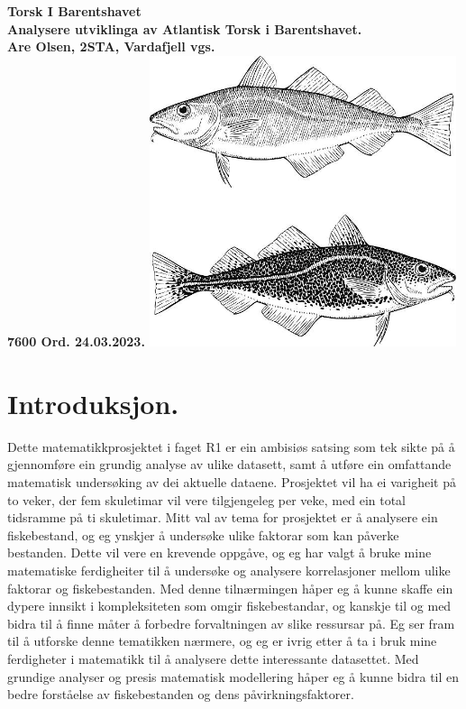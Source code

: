 \documentclass{report}
\begin{document}
\date{\today}
\begin{titlepage}
	\centering
	\vfill
	{\bfseries
		\Huge Torsk I Barentshavet\\ \Large
		Analysere utviklinga av Atlantisk Torsk i Barentshavet.\\
		\vskip2cm
		Are Olsen, 2STA, Vardafjell vgs.\\
		7600 Ord. 24.03.2023.
	}
	\vfill
	\includegraphics[width=9cm]{Bileter/Torsk.jpg} %
	\vfill
	\vfill
\end{titlepage}



\tableofcontents

\chapter{Introduksjon.}
Dette matematikkprosjektet i faget R1 er ein ambisiøs satsing som tek sikte på å gjennomføre ein grundig analyse av ulike datasett, samt å utføre ein omfattande matematisk undersøking av dei aktuelle dataene. Prosjektet vil ha ei varigheit på to veker, der fem skuletimar vil vere tilgjengeleg per veke, med ein total tidsramme på ti skuletimar.
Mitt val av tema for prosjektet er å analysere ein fiskebestand, og eg ynskjer å undersøke ulike faktorar som kan påverke bestanden. Dette vil vere en krevende oppgåve, og eg har valgt å bruke mine matematiske ferdigheiter til å undersøke og analysere korrelasjoner mellom ulike faktorar og fiskebestanden. Med denne tilnærmingen håper eg å kunne skaffe ein dypere innsikt i kompleksiteten som omgir fiskebestandar, og kanskje til og med bidra til å finne måter å forbedre forvaltningen av slike ressursar på.
Eg ser fram til å utforske denne tematikken nærmere, og eg er ivrig etter å ta i bruk mine ferdigheter i matematikk til å analysere dette interessante datasettet. Med grundige analyser og presis matematisk modellering håper eg å kunne bidra til en bedre forståelse av fiskebestanden og dens påvirkningsfaktorer.
\end{document}
